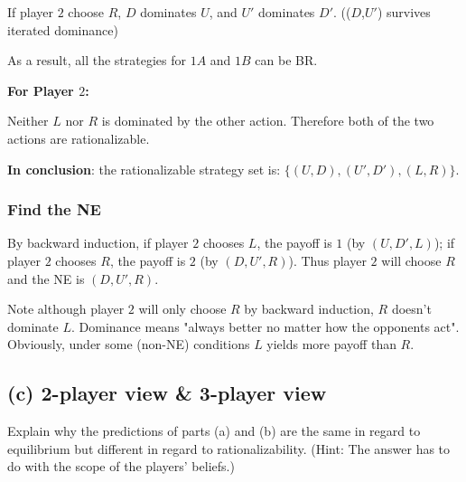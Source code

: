 \documentclass{article}
\begin{document}
If player $2$ choose $R$, $D$ dominates $U$, and  $U'$ dominates $D'$. (($D$,$U'$) survives iterated dominance)

As a result, all the strategies for $1A$ and $1B$ can be BR.

\medskip

\textbf{For Player $2$:} 

Neither $L$ nor $R$ is dominated by the other action. Therefore both of the two 
actions are rationalizable.

\medskip

\textbf{In conclusion}: the rationalizable strategy set is: $\{(U,D),(U',D'),(L,R)\}$.

\subsubsection*{Find the NE}
By backward induction, if player $2$ chooses $L$, the payoff is $1$ (by $(U,D',L)$); if player $2$ chooses $R$, the payoff is $2$ (by $(D,U',R)$). Thus player $2$ will choose $R$ and the NE is $(D,U',R)$.

\begin{mdframed}[backgroundcolor=blue!20,linecolor=white]
Note although player $2$ will only choose $R$ by backward induction, $R$ doesn't dominate $L$. Dominance means "always better no matter how the opponents act". Obviously, under some (non-NE) conditions $L$ yields more payoff than $R$.
\end{mdframed}

\subsection*{(c) 2-player view \& 3-player view}
Explain why the predictions of parts (a) and (b) are the same in regard
to equilibrium but different in regard to rationalizability. (Hint: The
answer has to do with the scope of the players' beliefs.)
\end{document}
